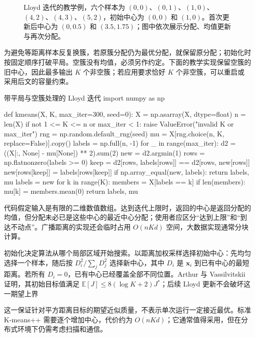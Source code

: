 \Needspace{65mm}
\begin{figure}[htbp]
 \centering
 
 \caption{Lloyd 迭代的教学例，六个样本为 $(0,0)$、$(0,1)$、$(1,0)$、$(4,2)$、$(4,3)$、$(5,2)$，初始中心为 $(0,0)$ 和 $(1,0)$。首次更新后中心为 $(0,0.5)$ 和 $(3.5,1.75)$；图中依次展示分配、均值更新与再次分配。}
 \label{fig:clustering-lloyd-steps}
\end{figure}

为避免等距离样本反复换簇，若原簇分配仍为最优分配，就保留原分配；初始化时按固定顺序打破平局。空簇没有均值，必须另作约定。下面的教学实现保留空簇的旧中心，因此最多输出 $K$ 个非空簇；若应用要求恰好 $K$ 个非空簇，可以重启或采用后文的容量约束。

\begin{codeblock}[language=Python,label={code:clustering-kmeans}]{带平局与空簇处理的 Lloyd 迭代}
import numpy as np

def kmeans(X, K, max_iter=300, seed=0):
    X = np.asarray(X, dtype=float)
    n = len(X)
    if not 1 <= K <= n or max_iter < 1:
        raise ValueError("invalid K or max_iter")
    rng = np.random.default_rng(seed)
    mu = X[rng.choice(n, K, replace=False)].copy()
    labels = np.full(n, -1)
    for _ in range(max_iter):
        d2 = ((X[:, None] - mu[None]) ** 2).sum(2)
        new = d2.argmin(1)
        rows = np.flatnonzero(labels >= 0)
        keep = d2[rows, labels[rows]] == d2[rows, new[rows]]
        new[rows[keep]] = labels[rows[keep]]
        if np.array_equal(new, labels):
            return labels, mu
        labels = new
        for k in range(K):
            members = X[labels == k]
            if len(members):
                mu[k] = members.mean(0)
    return labels, mu
\end{codeblock}

代码假定输入是有限的二维数值数组。达到迭代上限时，返回的中心是返回分配的均值，但分配未必已是这些中心的最近中心分配；使用者应区分“达到上限”和“到达不动点”。广播距离的实现还会临时占用 $O(nKd)$ 空间，大数据实现通常分块计算。

初始化决定算法从哪个局部区域开始搜索。以距离加权采样选择初始中心：先均匀选择一个样本，随后按 $D_i^2/\sum_jD_j^2$ 选择新中心，其中 $D_i$ 是 $\bm{x}_i$ 到已有中心的最短距离。若所有 $D_i=0$，已有中心已经覆盖全部不同位置。Arthur 与 Vassilvitskii 证明，其初始目标值满足 $\mathbb{E}[J]\leq8(\log K+2)J^\ast$；后续 Lloyd 更新不会破坏这一期望上界

这一保证针对平方距离目标的期望近似质量，不表示单次运行一定接近最优。标准 K-means++ 需要逐个增加中心，代价约为 $O(nKd)$；它通常值得采用，但在分布式环境下仍需考虑扫描和通信。

